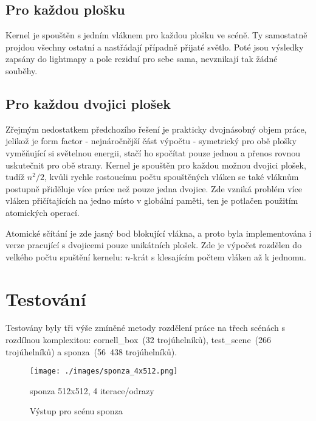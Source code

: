 \documentclass[czech]{pyt-report}
\begin{document}
\subsection{Pro každou plošku}
\label{sec:cuda-plosky}

Kernel je spouštěn s jedním vláknem pro každou plošku ve scéně. Ty samostatně projdou všechny ostatní a nastřádají případně přijaté světlo. Poté jsou výsledky zapsány do lightmapy a pole reziduí pro sebe sama, nevznikají tak žádné souběhy.

\subsection{Pro každou dvojici plošek}
\label{sec:cuda-dvojice}

Zřejmým nedostatkem předchozího řešení je prakticky dvojnásobný objem práce, jelikož je form factor - nejnáročnější část výpočtu - symetrický pro obě plošky vyměňující si světelnou energii, stačí ho spočítat pouze jednou a přenos rovnou uskutečnit pro obě strany. Kernel je spouštěn pro každou možnou dvojici plošek, tudíž $n^2 / 2$, kvůli rychle rostoucímu počtu spouštěných vláken se také vláknům postupně přiděluje více práce než pouze jedna dvojice. Zde  vzniká problém více vláken přičítajících na jedno místo v globální paměti, ten je potlačen použitím atomických operací.

Atomické sčítání je zde jasný bod blokující vlákna, a proto byla implementována i verze pracující s dvojicemi pouze unikátních plošek. Zde je výpočet rozdělen do velkého počtu spuštění kernelu: $n$-krát s klesajícím počtem vláken až k jednomu.

\section{Testování}
\label{sec:test}

Testovány byly tři výše zmíněné metody rozdělení práce na třech scénách s rozdílnou komplexitou: cornell\_box~(32 trojúhelníků), test\_scene~(266 trojúhelníků) a sponza~(56~438 trojúhelníků).

\begin{figure}[h]
  \centering\leavevmode
  \texttt{[image: ./images/sponza\_4x512.png]}\vskip-0.5cm
  \bigskip
  \caption{Výstup pro scénu sponza}
  \smallskip
  \small sponza 512x512, 4 iterace/odrazy
  \label{fig:sponza}
\end{figure}
\end{document}
